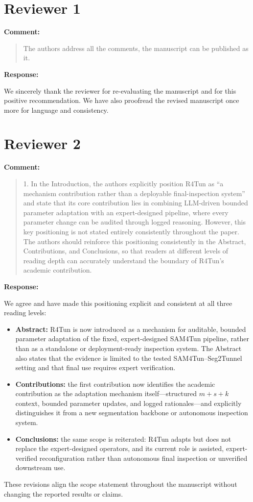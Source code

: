 \documentclass[11pt,a4paper]{article}
\newenvironment{commentblock}{%
  \par\smallskip\noindent\textbf{Comment:}\par
  \begin{quote}\itshape\color{black}
}{%
  \end{quote}\smallskip
}
\newenvironment{responseblock}{%
  \par\smallskip\noindent\textbf{Response:}\par
  \begingroup\color{responsegreen}
}{%
  \endgroup\smallskip
}
\begin{document}
\section*{Reviewer 1}

\begin{commentblock}
The authors address all the comments, the manuscript can be published as it.
\end{commentblock}
\begin{responseblock}
We sincerely thank the reviewer for re-evaluating the manuscript and for this positive recommendation. We have also proofread the revised manuscript once more for language and consistency.
\end{responseblock}

\section*{Reviewer 2}

\begin{commentblock}
1. In the Introduction, the authors explicitly position R4Tun as ``a mechanism contribution rather than a deployable final-inspection system'' and state that its core contribution lies in combining LLM-driven bounded parameter adaptation with an expert-designed pipeline, where every parameter change can be audited through logged reasoning. However, this key positioning is not stated entirely consistently throughout the paper. The authors should reinforce this positioning consistently in the Abstract, Contributions, and Conclusions, so that readers at different levels of reading depth can accurately understand the boundary of R4Tun's academic contribution.
\end{commentblock}
\begin{responseblock}
We agree and have made this positioning explicit and consistent at all three reading levels:
\begin{itemize}[nosep]
  \item \textbf{Abstract:} R4Tun is now introduced as a mechanism for auditable, bounded parameter adaptation of the fixed, expert-designed SAM4Tun pipeline, rather than as a standalone or deployment-ready inspection system. The Abstract also states that the evidence is limited to the tested SAM4Tun--Seg2Tunnel setting and that final use requires expert verification.
  \item \textbf{Contributions:} the first contribution now identifies the academic contribution as the adaptation mechanism itself---structured $m+s+k$ context, bounded parameter updates, and logged rationales---and explicitly distinguishes it from a new segmentation backbone or autonomous inspection system.
  \item \textbf{Conclusions:} the same scope is reiterated: R4Tun adapts but does not replace the expert-designed operators, and its current role is assisted, expert-verified reconfiguration rather than autonomous final inspection or unverified downstream use.
\end{itemize}
These revisions align the scope statement throughout the manuscript without changing the reported results or claims.
\end{responseblock}
\end{document}
